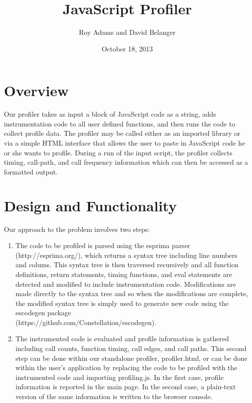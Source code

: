 \documentclass[11pt]{article}
\begin{document}
\newenvironment{myindentpar}[1]%
{\begin{list}{}%
         {\setlength{\leftmargin}{#1}}%
         \item[]%
}
{\end{list}}

\title{JavaScript Profiler}
\date{October 18, 2013}
\author{Roy Adams and David Belanger}

\maketitle

\section{Overview}

	Our profiler takes as input a block of JavaScript code as a string, adds instrumentation code 
to all user defined functions, and then runs the code to collect profile data. The profiler may 
be called either as an imported library or via a simple HTML interface that allows the user to 
paste in JavaScript code he or she wants to profile. During a run of the input script, the profiler 
collects timing, call-path, and call frequency information which can then be accessed as a formatted output. 

\section{Design and Functionality}
	
Our approach to the problem involves two steps:
\begin{enumerate}
\item  The code to be profiled is parsed using the 
esprima parser (http://esprima.org/), which returns a syntax tree including line numbers and colums. This 
syntax tree is then traversed recursively and all function definitions, return statements, timing 
functions, and eval statements are detected and modified to include instrumentation code. Modifications 
are made directly to the syntax tree and so when the modifications are complete, the modified syntax 
tree is simply used to generate new code using the escodegen package \\(https://github.com/Constellation/escodegen).
\item The instrumented code is evaluated and profile information is gathered including call counts, function timing, call edges, and call paths. This second step can be done within our standalone profiler, 
profiler.html, or can be done within the user's application by replacing the code to be profiled 
with the instrumented code and importing profiling.js. In the first case, profile information is 
reported in the main page. In the second case, a plain-text version of
the same information is written to the browser console.
\end{enumerate}
\end{document}
